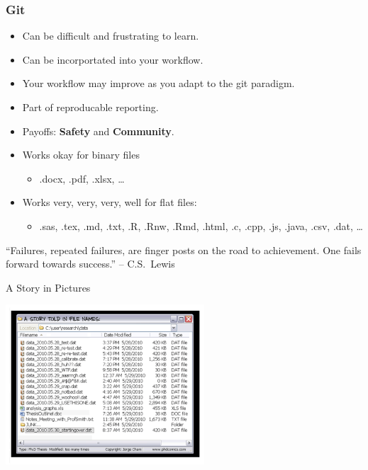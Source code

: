   \begin{frame}[t]
    \frametitle{Git}
    \begin{itemize}
      \item Can be difficult and frustrating to learn.
      \item Can be incorportated into your workflow.
      \item Your workflow may improve as you adapt to the git paradigm.
      \item Part of reproducable reporting.
      \item Payoffs: {\bf Safety} and {\bf Community}.
      \item Works okay for binary files 
        \begin{itemize} \item .docx, .pdf, .xlsx, \ldots \end{itemize}
      \item Works very, very, very, well for flat files: 
        \begin{itemize} \item .sas, .tex, .md, .txt, .R, .Rnw, .Rmd, .html, .c,
          .cpp, .js, .java, .csv, .dat, \ldots \end{itemize}
        
    \end{itemize}
    ``Failures, repeated failures, are finger posts on the road to achievement.
    One fails forward towards success.'' -- C.S.\ Lewis
  \end{frame}

  \begin{frame}[t]{A Story in Pictures} 
    \begin{center}
      \includegraphics[height=2.350in]{./images/phd052810s} 
    \end{center} 
  \end{frame}
    

